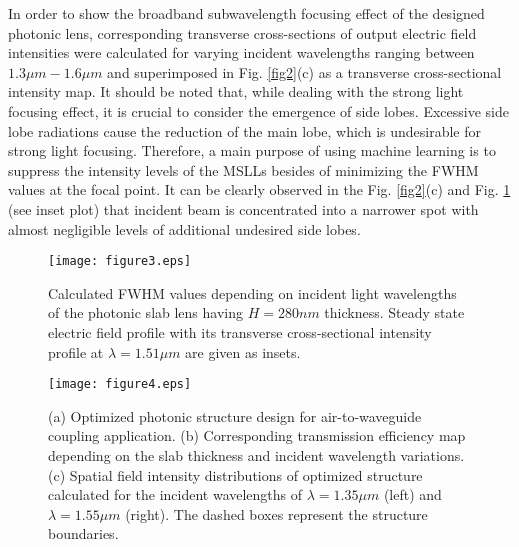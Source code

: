 \documentclass[9pt,twocolumn,twoside]{article}
\begin{document}
  In order to show the broadband subwavelength focusing effect of the designed photonic lens, corresponding transverse cross-sections of output electric field intensities were calculated for varying incident wavelengths ranging between $1.3 \mu m-1.6 \mu m$ and superimposed in Fig. \ref{fig2}(c) as a transverse cross-sectional intensity map. It should be noted that, while dealing with the strong light focusing effect, it is crucial to consider the emergence of side lobes. Excessive side lobe radiations cause the reduction of the main lobe, which is undesirable for strong light focusing. Therefore, a main purpose of using machine learning is to suppress the intensity levels of the MSLLs besides of minimizing the FWHM values at the focal point. It can be clearly observed in the Fig. \ref{fig2}(c) and Fig. \ref{FWHM} (see inset plot) that incident beam is concentrated into a narrower spot with almost negligible levels of additional undesired side lobes.
 
  \begin{figure}[!b]
    \centering
    \texttt{[image: figure3.eps]}
    \caption{ Calculated FWHM values depending on incident light wavelengths of the photonic slab lens having $H=280nm$ thickness. 
      Steady state electric field profile with its transverse cross-sectional  intensity profile at $\lambda={1.51\mu m}$ are given as insets.}
    \label{FWHM}
  \end{figure}
  
    \begin{figure*}[!t]
    \centering
    \texttt{[image: figure4.eps]}
    \caption{(a) Optimized photonic structure design for air-to-waveguide coupling application. (b) Corresponding transmission efficiency map depending on the slab thickness and incident wavelength variations. (c) Spatial field intensity distributions of optimized structure calculated for the incident wavelengths of $\lambda = 1.35\mu m$ (left) and $\lambda = 1.55 \mu m$ (right). The dashed boxes represent the structure boundaries.}
    \label{optimization}
  \end{figure*}
  
\end{document}
